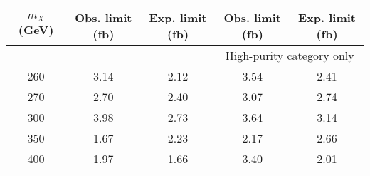 \begin{tabular}{ | c || c | c || c | c |}
\hline
$m_X$ (GeV) & Obs. limit (fb) & Exp. limit (fb) & Obs. limit (fb) & Exp. limit (fb) \\ \hline
 & & &  \multicolumn{2}{c|}{High-purity category only} \\ \hline
260 & 3.14 & 2.12 & 3.54 & 2.41 \\
270 & 2.70 & 2.40 & 3.07 & 2.74 \\
300 & 3.98 & 2.73 & 3.64 & 3.14 \\
350 & 1.67 & 2.23 & 2.17 & 2.66 \\
400 & 1.97 & 1.66 & 3.40 & 2.01 \\ \hline
\end{tabular}

